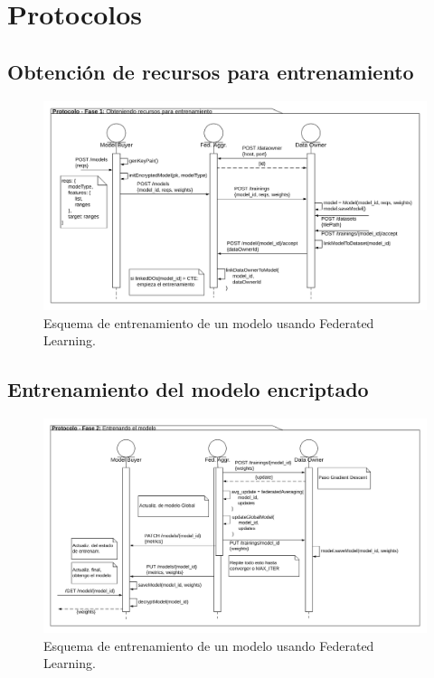 \documentclass[
11pt, %
oneside, %
spanish, %
singlespacing, %
parskip, %
headsepline, %
chapterinoneline, %
]{MastersDoctoralThesis} %
\begin{document}
\section{Protocolos}

\subsection*{Obtención de recursos para entrenamiento}
\begin{figure}[H]
  	\centering
	\includegraphics[scale=0.1]{imgs/flujo_fase1.png}
	\caption{Esquema de entrenamiento de un modelo usando Federated Learning.}
\end{figure}

\subsection*{Entrenamiento del modelo encriptado}
\begin{figure}[H]
  	\centering
	\includegraphics[scale=0.1]{imgs/flujo_fase2.png}
	\caption{Esquema de entrenamiento de un modelo usando Federated Learning.}
\end{figure}
\end{document}
